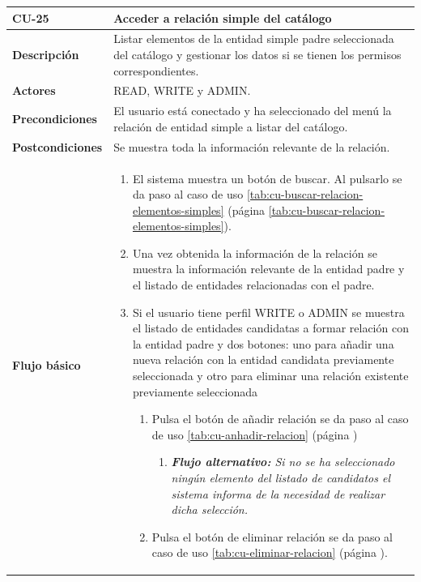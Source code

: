 \begin{table} [H]
    \centering
    \setlength{\leftmargini}{0.4cm}
	\resizebox{14cm}{!} { %
    \begin{tabular}{| m{3cm} | m{11cm} |}   
    \hline
	  \textbf{CU-25} & \textbf{Acceder a relación simple del catálogo} \\\hline
	  \textbf{Descripción} & Listar elementos de la entidad simple padre seleccionada del catálogo y gestionar los datos si se tienen los permisos correspondientes. \\\hline
	  \textbf{Actores} & READ, WRITE y ADMIN. \\\hline
	  \textbf{Precondiciones} & El usuario está conectado y ha seleccionado del menú la relación de entidad simple a listar del catálogo. \\\hline
	  \textbf{Postcondiciones} & Se muestra toda la información relevante de la relación. \\\hline
	  \textbf{Flujo básico} & 
		\begin{enumerate}
	  	\item El sistema muestra un botón de buscar. Al pulsarlo se da paso al caso de uso \ref{tab:cu-buscar-relacion-elementos-simples} (página \ref{tab:cu-buscar-relacion-elementos-simples}).
	  	\item Una vez obtenida la información de la relación se muestra la información relevante de la entidad padre y el listado de entidades relacionadas con el padre.
	  	\item Si el usuario tiene perfil WRITE o ADMIN se muestra el listado de entidades candidatas a formar relación con la entidad padre y dos botones: uno para añadir una nueva relación con la entidad candidata previamente seleccionada y otro para eliminar una relación existente previamente seleccionada
	  	\begin{enumerate}
		        \item Pulsa el botón de añadir relación se da paso al caso de uso \ref{tab:cu-anhadir-relacion} (página \pageref{tab:cu-anhadir-relacion})
					\begin{enumerate}	
			   		\item  \textit{\textbf{Flujo alternativo:} Si no se ha seleccionado ningún elemento del listado de candidatos el sistema informa de la necesidad de realizar dicha selección.}
			   		\end{enumerate}		
		        \item Pulsa el botón de eliminar relación se da paso al caso de uso \ref{tab:cu-eliminar-relacion} (página \pageref{tab:cu-eliminar-relacion}).

\end{enumerate}
\end{enumerate}
\end{tabular}}
\end{table}

